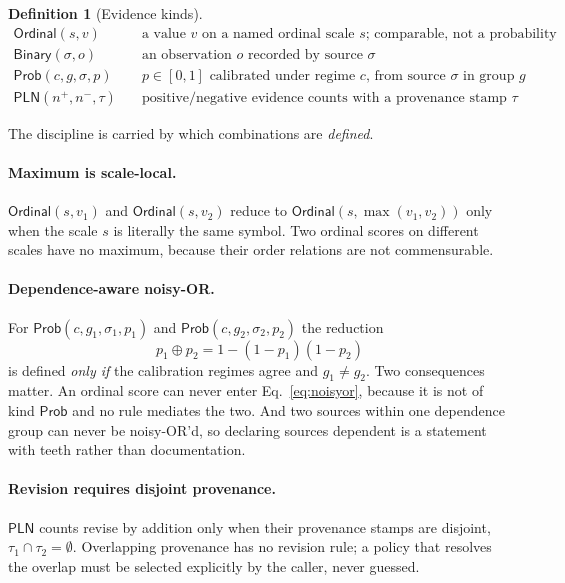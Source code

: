 \documentclass[11pt]{article}
\newtheorem{definition}{Definition}
\newcommand{\kind}[1]{\ensuremath{\mathsf{#1}}}
\begin{document}
\begin{definition}[Evidence kinds]
\begin{align*}
  \kind{Ordinal}(s, v)             &\quad \text{a value $v$ on a named ordinal scale $s$; comparable, not a probability}\\
  \kind{Binary}(\sigma, o)         &\quad \text{an observation $o$ recorded by source $\sigma$}\\
  \kind{Prob}(c, g, \sigma, p)     &\quad \text{$p \in [0,1]$ calibrated under regime $c$, from source $\sigma$ in group $g$}\\
  \kind{PLN}(n^{+}, n^{-}, \tau)   &\quad \text{positive/negative evidence counts with a provenance stamp $\tau$}
\end{align*}
\end{definition}

The discipline is carried by which combinations are \emph{defined}.

\paragraph{Maximum is scale-local.} $\kind{Ordinal}(s,v_1)$ and
$\kind{Ordinal}(s,v_2)$ reduce to $\kind{Ordinal}(s,\max(v_1,v_2))$ only when
the scale $s$ is literally the same symbol. Two ordinal scores on different
scales have no maximum, because their order relations are not commensurable.

\paragraph{Dependence-aware noisy-OR.} For
$\kind{Prob}(c,g_1,\sigma_1,p_1)$ and $\kind{Prob}(c,g_2,\sigma_2,p_2)$ the
reduction
\begin{equation}
  p_1 \oplus p_2 = 1 - (1-p_1)(1-p_2)
  \label{eq:noisyor}
\end{equation}
is defined \emph{only if} the calibration regimes agree and $g_1 \neq g_2$.
Two consequences matter. An ordinal score can never enter
Eq.~\ref{eq:noisyor}, because it is not of kind $\kind{Prob}$ and no rule
mediates the two. And two sources within one dependence group can never be
noisy-OR'd, so declaring sources dependent is a statement with teeth rather
than documentation.

\paragraph{Revision requires disjoint provenance.} $\kind{PLN}$ counts revise by
addition only when their provenance stamps are disjoint, $\tau_1 \cap \tau_2 =
\emptyset$. Overlapping provenance has no revision rule; a policy that resolves
the overlap must be selected explicitly by the caller, never guessed.
\end{document}
